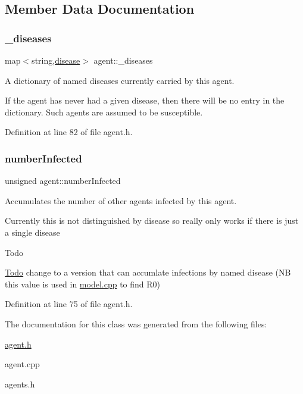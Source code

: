 \subsection{Member Data Documentation}
\mbox{\label{classagent_a2352342e95bc77041c07c0dafdfb7cd2}} 
\subsubsection{\texorpdfstring{\+\_\+diseases}{\_diseases}}
{\footnotesize\ttfamily map$<$string,\mbox{\hyperlink{classdisease}{disease}}$>$ agent\+::\+\_\+diseases}



A dictionary of named diseases currently carried by this agent. 

If the agent has never had a given disease, then there will be no entry in the dictionary. Such agents are assumed to be susceptible. 

Definition at line 82 of file agent.\+h.

\mbox{\label{classagent_a4145c90d534f84deb22a93560809134c}} 
\subsubsection{\texorpdfstring{number\+Infected}{numberInfected}}
{\footnotesize\ttfamily unsigned agent\+::number\+Infected}



Accumulates the number of other agents infected by this agent. 

Currently this is not distinguished by disease so really only works if there is just a single disease \begin{DoxyRefDesc}{Todo}
\item[\mbox{\hyperlink{todo__todo000001}{Todo}}]change to a version that can accumlate infections by named disease (NB this value is used in \mbox{\hyperlink{model_8cpp}{model.\+cpp}} to find R0) \end{DoxyRefDesc}


Definition at line 75 of file agent.\+h.



The documentation for this class was generated from the following files\+:\begin{DoxyCompactItemize}
\item 
\mbox{\hyperlink{agent_8h}{agent.\+h}}\item 
agent.\+cpp\item 
agents.\+h\end{DoxyCompactItemize}
